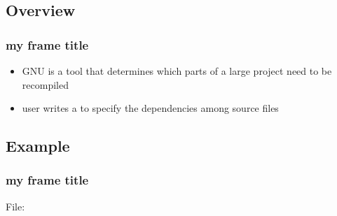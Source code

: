 \subsection{Overview}

\begin{frame}
\frametitle{my frame title}
\begin{itemize}
\item GNU \make{} is a tool that determines
  which parts of a large project need to be recompiled
\item user writes a  to specify
  the dependencies among source files
\end{itemize}
\end{frame}

\subsection{Example}

\begin{frame}
\frametitle{my frame title}
File: 
\codes{}
\end{frame}
